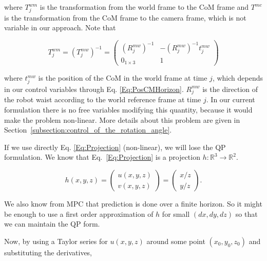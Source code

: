 \noindent where $T^{wm}_j$ is the transformation from the world frame to the CoM frame and $T^{mc}$ is the transformation from the CoM frame to the camera frame, which is not variable in our approach. Note that

$$
T^{wm}_j = (T^{mw}_j)^{-1} = 
\left(
\begin{matrix}
(R^{mw}_j)^{-1} & -(R^{mw}_j)^{-1}t^{mw}_j \\
0_{1 \times 3} & 1
\end{matrix}
\right)
$$ 

\noindent where $t^{mw}_j$ is the position of the CoM in the world frame at time $j$, which depends in our control variables through Eq. \ref{Eq:PosCMHorizon}.
$R^{mw}_j$ is the direction of the robot waist according to the world reference frame at time $j$. In our current formulation 
there is no free variables modifying this quantity, because it would make the problem non-linear. More details
about this problem are given in Section~\ref{subsection:control_of_the_rotation_angle}.

If we use directly Eq. \ref{Eq:Projection} (non-linear), we will lose the QP formulation. 
We know that Eq.~\ref{Eq:Projection} is a projection $h:\mathbb{R}^3 \rightarrow \mathbb{R}^2$.

\begin{equation*}
h(x,y,z) =
 \left(
 \begin{matrix}
  u(x,y,z) \\
  v(x,y,z)
 \end{matrix}
 \right)
 = \left(
 \begin{matrix}
  x / z\\
  y / z
 \end{matrix}
 \right).
\end{equation*}


We also know from MPC that prediction is done over a finite horizon. So it might be enough to use a first order approximation of $h$ for small $(dx,dy,dz)$ so that we can maintain the QP form.

Now, by using a Taylor series for $u(x,y,z)$ around some point $(x_0,y_0,z_0)$ and substituting the derivatives,


